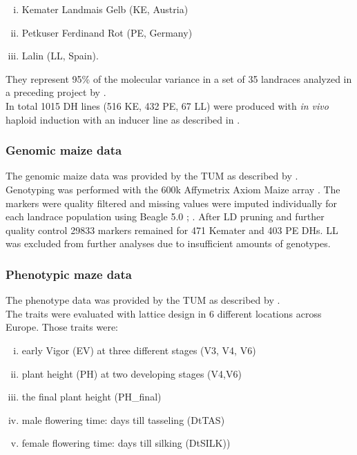 \begin{enumerate}[(i)]
\item Kemater Landmais Gelb (KE, Austria)
\item Petkuser Ferdinand Rot (PE, Germany)
\item Lalin (LL, Spain).
\end{enumerate}

They represent 95\% of the molecular variance in a set of
35 landraces analyzed in a preceding project by \cite{mayer2017there}.\\
In total 1015 DH lines (516 KE, 432 PE, 67 LL) were produced with \textit{in vivo} haploid
induction with an inducer line as described in \cite{roeber2005vivo}.


\subsubsection{Genomic maize data}
The genomic maize data was provided by the TUM as described by \cite{holker2019european}.\\
Genotyping was performed with the 600k Affymetrix\textsuperscript{\textregistered}
Axiom\textsuperscript{\textregistered} Maize array \cite{unterseer2014powerful}. The
markers were quality filtered and missing values were imputed individually for each
landrace population using Beagle 5.0 \cite{browning2007rapid};
\cite{browning2018one}. After LD pruning and further quality control 29833 markers
remained for 471 Kemater and 403 PE DHs. LL was excluded from further analyses due to
insufficient amounts of genotypes.

\subsubsection{Phenotypic maze data}
The phenotype data was provided by the TUM as described by \cite{holker2019european}. \\
The traits were evaluated with lattice design in 6 different locations across
Europe. Those traits were:

\begin{enumerate}[(i)]
\item early Vigor (EV) at three different stages (V3, V4, V6)
\item plant height (PH) at two developing stages (V4,V6)
\item the final plant height (PH\_final)
\item male flowering time: days till tasseling (DtTAS)
\item female flowering time: days till silking (DtSILK)) 
\end{enumerate}


